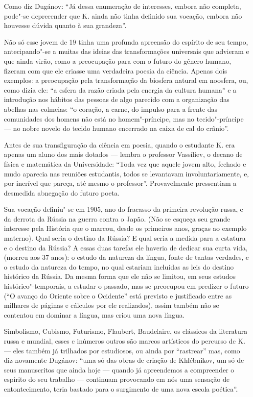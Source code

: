 Como diz Dugánov: ``Já dessa enumeração de interesses, embora não
completa, pode"-se depreeender que K. ainda não tinha definido sua
vocação, embora não houvesse dúvida quanto à sua grandeza''.

Não só esse jovem de 19 tinha uma profunda apreensão do espírito de seu
tempo, antecipando"-se a muitas das ideias das transformações universais
que advieram e que ainda virão, como a preocupação para com o futuro do
gênero humano, fizeram com que ele criasse uma verdadeira poesia da
ciência. Apenas dois exemplos: a preocupação pela transformação da
biosfera natural em noosfera, ou, como dizia ele: ``a esfera da razão
criada pela energia da cultura humana'' e a introdução nos hábitos das
pessoas de algo parecido com a organização das abelhas nas colmeias: ``o coração, a carne, do impulso para a frente das comunidades dos homens
não está no homem"-príncipe, mas no tecido"-príncipe --- no nobre novelo do
tecido humano encerrado na caixa de cal do crânio''.

Antes de sua transfiguração da ciência em poesia, quando o estudante K.
era apenas um aluno dos mais dotados --- lembra o professor Vassíliev, o
decano de física e matemática da Universidade: ``Toda vez que aquele
jovem alto, fechado e mudo aparecia nas reuniões estudantis, todos se
levantavam involuntariamente, e, por incrível que pareça, até mesmo o
professor''. Provavelmente pressentiam a desmedida abnegação do futuro
poeta.

Sua vocação definiu"-se em 1905, ano do fracasso da primeira revolução
russa, e da derrota da Rússia na guerra contra o Japão. (Não se esqueça
seu grande interesse pela História que o marcou, desde os primeiros
anos, graças ao exemplo materno). Qual seria o destino da Rússia? E qual
seria a medida para a estatura e o destino da Rússia? A essas duas
tarefas ele haveria de dedicar sua curta vida, (morreu aos
37 anos): o estudo da natureza da língua, fonte de tantas verdades, e o
estudo da natureza do tempo, no qual estariam incluídas as leis do
destino histórico da Rússia. Da mesma forma que ele não se limitou, em
seus estudos histórico"-temporais, a estudar o passado, mas se preocupou
em predizer o futuro (``O avanço do Oriente sobre o Ocidente'' está
previsto e justificado entre as milhares de páginas e cálculos por ele
realizados), assim também não se contentou em dominar a língua, mas
criou uma nova língua.

Simbolismo, Cubismo, Futurismo, Flaubert, Baudelaire, os clássicos da
literatura russa e mundial, esses e inúmeros outros são marcos
artísticos do percurso de K. --- eles também já trilhados por estudiosos,
ou ainda por ``rastrear'' mas, como diz novamente Dugánov: ``uma só das
obras de criação de Khlébnikov, um só de seus manuscritos que ainda hoje
--- quando já apreendemos a compreender o espírito do seu trabalho ---
continuam provocando em nós uma sensação de entontecimento, teria
bastado para o surgimento de uma nova escola poética''.

